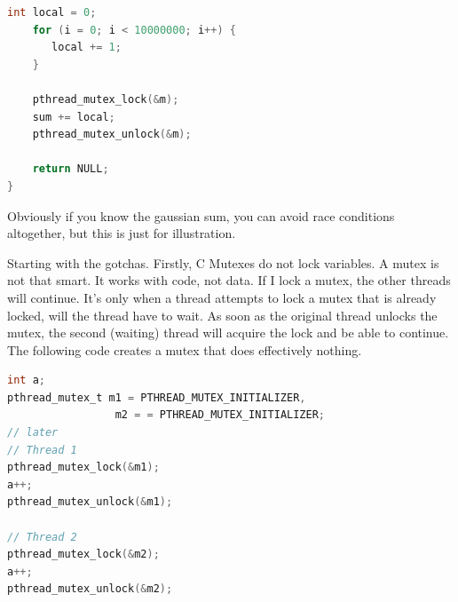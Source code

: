 \begin{lstlisting}[language=C]
    int local = 0;
    for (i = 0; i < 10000000; i++) {
       local += 1;
    }

    pthread_mutex_lock(&m);
    sum += local;
    pthread_mutex_unlock(&m);

    return NULL;
}
\end{lstlisting}

Obviously if you know the gaussian sum, you can avoid race conditions altogether, but this is just for illustration.

Starting with the gotchas.
Firstly, C Mutexes do not lock variables.
A mutex is not that smart.
It works with code, not data.
If I lock a mutex, the other threads will continue.
It's only when a thread attempts to lock a mutex that is already locked, will the thread have to wait.
As soon as the original thread unlocks the mutex, the second (waiting) thread will acquire the lock and be able to continue.
The following code creates a mutex that does effectively nothing.

\begin{lstlisting}[language=C]
int a;
pthread_mutex_t m1 = PTHREAD_MUTEX_INITIALIZER,
                 m2 = = PTHREAD_MUTEX_INITIALIZER;
// later
// Thread 1
pthread_mutex_lock(&m1);
a++;
pthread_mutex_unlock(&m1);

// Thread 2
pthread_mutex_lock(&m2);
a++;
pthread_mutex_unlock(&m2);
\end{lstlisting}

